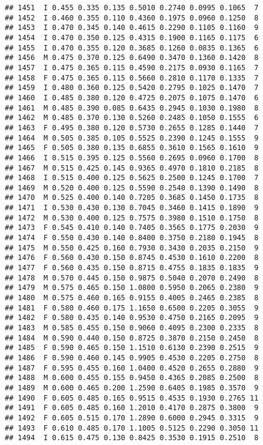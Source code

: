 \documentclass[
]{article}
\begin{document}
\begin{verbatim}
## 1451  I 0.455 0.335 0.135 0.5010 0.2740 0.0995 0.1065  7
## 1452  I 0.460 0.355 0.110 0.4360 0.1975 0.0960 0.1250  8
## 1453  I 0.470 0.345 0.140 0.4615 0.2290 0.1105 0.1160  9
## 1454  I 0.470 0.350 0.125 0.4315 0.1900 0.1165 0.1175  6
## 1455  I 0.470 0.355 0.120 0.3685 0.1260 0.0835 0.1365  6
## 1456  M 0.475 0.370 0.125 0.6490 0.3470 0.1360 0.1420  8
## 1457  I 0.475 0.365 0.115 0.4590 0.2175 0.0930 0.1165  7
## 1458  F 0.475 0.365 0.115 0.5660 0.2810 0.1170 0.1335  7
## 1459  I 0.480 0.360 0.125 0.5420 0.2795 0.1025 0.1470  7
## 1460  I 0.485 0.380 0.120 0.4725 0.2075 0.1075 0.1470  6
## 1461  M 0.485 0.390 0.085 0.6435 0.2945 0.1030 0.1980  8
## 1462  M 0.485 0.370 0.130 0.5260 0.2485 0.1050 0.1555  6
## 1463  F 0.495 0.380 0.120 0.5730 0.2655 0.1285 0.1440  7
## 1464  M 0.505 0.385 0.105 0.5525 0.2390 0.1245 0.1555  9
## 1465  F 0.505 0.380 0.135 0.6855 0.3610 0.1565 0.1610  9
## 1466  I 0.515 0.395 0.125 0.5560 0.2695 0.0960 0.1700  8
## 1467  M 0.515 0.425 0.145 0.9365 0.4970 0.1810 0.2185  8
## 1468  I 0.515 0.400 0.125 0.5625 0.2500 0.1245 0.1700  7
## 1469  M 0.520 0.400 0.125 0.5590 0.2540 0.1390 0.1490  8
## 1470  M 0.525 0.400 0.140 0.7205 0.3685 0.1450 0.1735  8
## 1471  I 0.530 0.430 0.130 0.7045 0.3460 0.1415 0.1890  9
## 1472  M 0.530 0.400 0.125 0.7575 0.3980 0.1510 0.1750  8
## 1473  F 0.545 0.410 0.140 0.7405 0.3565 0.1775 0.2030  9
## 1474  F 0.550 0.430 0.140 0.8400 0.3750 0.2180 0.1945  8
## 1475  M 0.550 0.425 0.160 0.7930 0.3430 0.2035 0.2150  9
## 1476  F 0.560 0.430 0.150 0.8745 0.4530 0.1610 0.2200  8
## 1477  F 0.560 0.435 0.150 0.8715 0.4755 0.1835 0.1835  9
## 1478  M 0.570 0.445 0.150 0.9875 0.5040 0.2070 0.2490  8
## 1479  M 0.575 0.465 0.150 1.0800 0.5950 0.2065 0.2380  9
## 1480  M 0.575 0.460 0.165 0.9155 0.4005 0.2465 0.2385  8
## 1481  F 0.580 0.460 0.175 1.1650 0.6500 0.2205 0.3055  9
## 1482  F 0.580 0.435 0.140 0.9530 0.4750 0.2165 0.2095  9
## 1483  M 0.585 0.455 0.150 0.9060 0.4095 0.2300 0.2335  8
## 1484  M 0.590 0.440 0.150 0.8725 0.3870 0.2150 0.2450  8
## 1485  F 0.590 0.465 0.150 1.1510 0.6130 0.2390 0.2515  9
## 1486  F 0.590 0.460 0.145 0.9905 0.4530 0.2205 0.2750  8
## 1487  F 0.595 0.455 0.160 1.0400 0.4520 0.2655 0.2880  9
## 1488  M 0.600 0.455 0.155 0.9450 0.4365 0.2085 0.2500  8
## 1489  M 0.600 0.465 0.200 1.2590 0.6405 0.1985 0.3570  9
## 1490  F 0.605 0.485 0.165 0.9515 0.4535 0.1930 0.2765 11
## 1491  F 0.605 0.485 0.160 1.2010 0.4170 0.2875 0.3800  9
## 1492  F 0.605 0.515 0.170 1.2890 0.6000 0.2945 0.3315  9
## 1493  F 0.610 0.485 0.170 1.1005 0.5125 0.2290 0.3050 11
## 1494  I 0.615 0.475 0.130 0.8425 0.3530 0.1915 0.2510  8

\end{verbatim}
\end{document}
